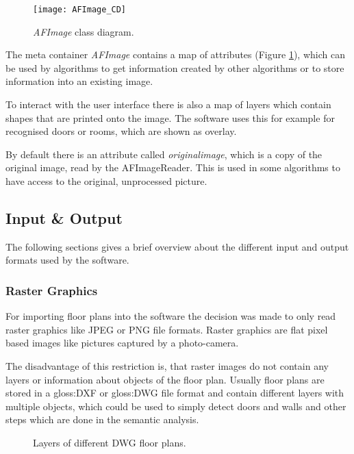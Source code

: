 \begin{figure}[H]
  \centering
      \texttt{[image: AFImage\_CD]}
  \caption{\textit{AFImage} class diagram.}
  \label{fig:AFImage_CD}
\end{figure}

The meta container \textit{AFImage} contains a map of attributes (Figure \ref{fig:AFImage_CD}), which can be used by algorithms to get information created by other algorithms or to store information into an existing image.

To interact with the user interface there is also a map of layers which contain shapes that are printed onto the image. The software uses this for example for recognised doors or rooms, which are shown as overlay.

By default there is an attribute called \textit{originalimage}, which is a copy of the original image, read by the AFImageReader. This is used in some algorithms to have access to the original, unprocessed picture.

\subsection{Input \& Output}
\label{sub:ImportExport}
The following sections gives a brief overview about the different input and output formats used by the software.

\subsubsection{Raster Graphics}
For importing floor plans into the software the decision was made to only read raster graphics like JPEG or PNG file formats. Raster graphics are flat pixel based images like pictures captured by a photo-camera.

The disadvantage of this restriction is, that raster images do not contain any layers or information about objects of the floor plan. Usually floor plans are stored in a \gls{gloss:DXF} or \gls{gloss:DWG} file format and contain different layers with multiple objects, which could be used to simply detect doors and walls and other steps which are done in the semantic analysis.

\begin{figure}[H]
	\centering
	\hfill
	\hfill
	\caption{Layers of different DWG floor plans. }
	\label{fig:layer_comparison}
\end{figure}

